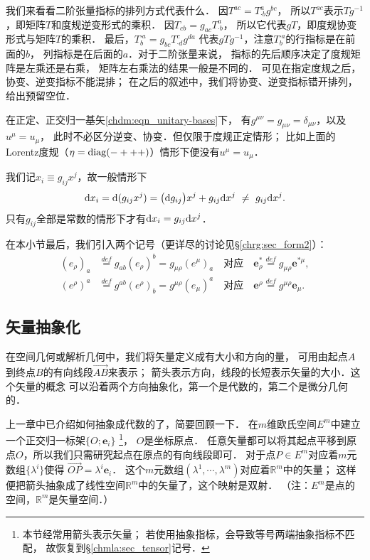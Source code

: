 我们来看看二阶张量指标的排列方式代表什么．
因$T^{ac}=T^{a}_{\cdot b}g^{bc}$，
所以$T^{ac}$表示$Tg^{-1}$，即矩阵$T$和度规逆变形式的乘积．
因$T_{cb}=g_{ac}T^{a}_{\cdot b}$，
所以它代表$g T$，即度规协变形式与矩阵$T$的乘积．
最后，$T^{\cdot a}_{b}=g_{bc}T^{c}_{\cdot d}g^{da}$
代表$g T g^{-1}$，注意$T^{\cdot a}_{b}$的行指标是在前面的$b$，
列指标是在后面的$a$．对于二阶张量来说，
指标的先后顺序决定了度规矩阵是左乘还是右乘，
矩阵左右乘法的结果一般是不同的．
可见在指定度规之后，协变、逆变指标不能混排；
在之后的叙述中，我们将协变、逆变指标错开排列，给出预留空位．

在{\kaishu 正定、正交归一}基矢\eqref{chdm:eqn_unitary-bases}下，
有$g^{\mu\nu}=g_{\mu\nu}=\delta_{\mu\nu}$，以及$u^\mu = u_\mu$，
此时不必区分逆变、协变．但仅限于度规正定情形；
比如上面的Lorentz度规（$\eta={\rm diag}(-+++)$）情形下便没有$u^\mu = u_\mu$．

我们记$x_i \equiv g_{ij}x^j$，故一般情形下
\begin{align}
	{\rm d}x_i = {\rm d}(g_{ij}x^j) = \bigl({\rm d}g_{ij}\bigr)x^j+ g_{ij}{\rm d}x^j
	\  \neq \ g_{ij}{\rm d}x^j.
\end{align}
只有$g_{ij}$全部是常数的情形下才有${\rm d}x_i =g_{ij}{\rm d}x^j$．

在本小节最后，我们引入两个记号（更详尽的讨论见\S\ref{chrg:sec_form2}）：
\begin{subequations}\label{chdm:eqn_eiud}
\begin{align}
	(e_\rho)_a &\overset{def}{=} g_{ab}(e_\rho)^b 
	= g_{\mu\rho}(e^\mu)_a
	\quad \text{对应}\quad 
	\boldsymbol{e}_\rho ^* \overset{def}{=} g_{\mu\rho} \boldsymbol{e}^{*\mu}, \\
	(e^\rho)^a &\overset{def}{=} g^{ab}(e^\rho)_b 
	= g^{\mu\rho}(e_\mu)^a 
	\quad \text{对应}\quad 
	\boldsymbol{e}^\rho \overset{def}{=} g^{\mu\rho} \boldsymbol{e}_{\mu} .
\end{align}
\end{subequations}

\subsection{矢量抽象化}\label{chdm:sec_vector-abstract2geo}
在空间几何或解析几何中，我们将矢量定义成有大小和方向的量，
可用由起点$A$到终点$B$的有向线段$\overrightarrow{AB}$来表示；
箭头表示方向，线段的长短表示矢量的大小．这个矢量的概念
可以沿着两个方向{\kaishu 抽象化}，第一个是代数的，第二个是微分几何的．

上一章中已介绍如何抽象成代数的了，简要回顾一下．
在$m$维欧氏空间$E^m$中建立一个正交归一标架$\{O;\boldsymbol{e}_i\}$
{\footnote{本节经常用箭头表示矢量；
        若使用抽象指标，会导致等号两端抽象指标不匹配，
    故恢复到\S\ref{chmla:sec_tensor}记号．}}，
$O$是坐标原点．
任意矢量都可以将其起点平移到原点$O$，所以我们只需研究起点在原点的有向线段即可．
对于点$P \in E^m$对应着$m$元数组$\{\lambda^i\}$使得
$    \overrightarrow{OP} = \lambda^i \boldsymbol{e}_i $．
这个$m$元数组$(\lambda^1,\cdots,\lambda^m)$对应着$\mathbb{R}^m$中的矢量；
这样便把箭头抽象成了线性空间$\mathbb{R}^m$中的矢量了，这个映射是双射．
（注：$E^m$是{\kaishu 点}的空间，$\mathbb{R}^m$是{\kaishu 矢量}空间．）

